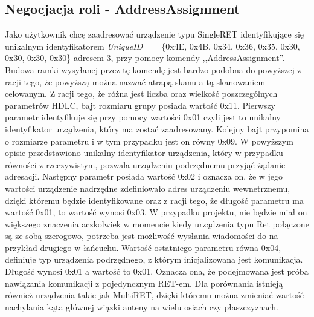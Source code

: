 		\subsection{Negocjacja roli - AddressAssignment}
			Jako użytkownik chcę zaadresować urządzenie typu SingleRET identyfikujące się unikalnym identyfikatorem \textit{UniqueID} == \{0x4E, 0x4B, 0x34, 0x36, 0x35, 0x30, 0x30, 0x30, 0x30\} adresem 3, 
			przy pomocy komendy ,,AddressAssignment''.
			\newline\newline
			Budowa ramki wysyłanej przez tę komendę jest bardzo podobna do powyższej z racji tego, że powyższą można nazwać atrapą skanu a tą skanowaniem celowanym.
			Z racji tego, że różna jest liczba oraz wielkość poszczególnych parametrów HDLC, bajt rozmiaru grupy posiada wartość 0x11.
			\newline
			Pierwszy parametr identyfikuje się przy pomocy wartości 0x01 czyli jest to unikalny identyfikator urządzenia, który ma zostać zaadresowany.
			Kolejny bajt przypomina o rozmiarze parametru i w tym przypadku jest on równy 0x09. W powyższym opisie przedstawiono unikalny identyfikator urządzenia, który w przypadku
			równości z rzeczywistym, pozwala urządzeniu podrzędnemu przyjąć żądanie adresacji.
			\newline
			Następny parametr posiada wartość 0x02 i oznacza on, że w jego wartości urządzenie nadrzędne zdefiniowało adres urządzeniu wewnetrznemu, dzięki któremu
			będzie identyfikowane oraz z racji tego, że długość parametru ma wartość 0x01, to wartość wynosi 0x03. W przypadku projektu, nie będzie miał on większego znaczenia
			aczkolwiek w momencie kiedy urządzenia typu Ret połączone są ze sobą szerogowo, potrzeba jest możliwość wysłania wiadomości do na przykład drugiego w łańcuchu.
			\newline
			Wartość ostatniego parametru równa 0x04, definiuje typ urządzenia podrzędnego, z którym inicjalizowana jest komunikacja. Długość wynosi 0x01 a wartość to 0x01.
			Oznacza ona, że podejmowana jest próba nawiązania komunikacji z pojedyncznym RET-em.
			Dla porównania istnieją również urządzenia takie jak MultiRET, dzięki któremu można zmieniać wartość nachylania kąta głównej wiązki anteny na wielu osiach czy płaszczyznach.
